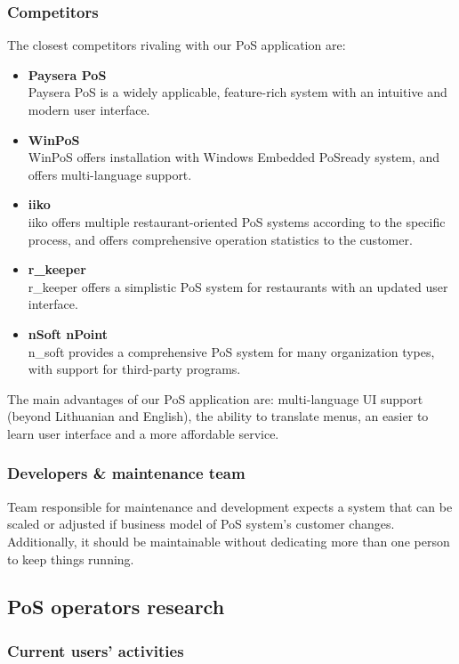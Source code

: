 \documentclass{article}
\begin{document}
\subsubsection{Competitors}The closest competitors rivaling with our PoS application are:
\begin{itemize}
    \item \textbf{Paysera PoS}
    \\Paysera PoS is a widely applicable, feature-rich system with an intuitive and modern user interface.
    \item \textbf{WinPoS}
    \\WinPoS offers installation with Windows Embedded PoSready system, and offers multi-language support.
    \item \textbf{iiko}
    \\iiko offers multiple restaurant-oriented PoS systems according to the specific process, and offers comprehensive operation statistics to the customer.
    \item \textbf{r\_keeper}
    \\r\_keeper offers a simplistic PoS system for restaurants with an updated user interface.
    \item \textbf{nSoft nPoint}
    \\n\_soft provides a comprehensive PoS system for many organization types, with support for third-party programs.
\end{itemize}
The main advantages of our PoS application are: multi-language UI support (beyond Lithuanian and English), the ability to translate menus, an easier to learn user interface and a more affordable service.
\subsubsection{Developers \& maintenance team}
Team responsible for maintenance and development expects a system that can be scaled or adjusted if business model of PoS system's customer changes. Additionally, it should be maintainable without dedicating more than one person to keep things running.  
\newpage
\subsection{PoS operators research}
\subsubsection{Current users' activities}
\end{document}

